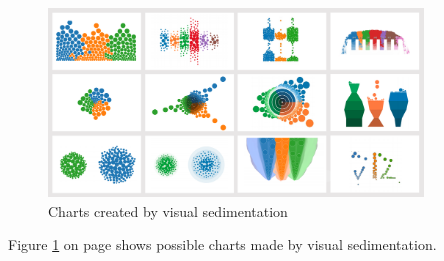 \begin{figure}[!htb]
\centering
\includegraphics[height=5cm]{images/methods/related/visual-sedimentation}
\caption[
    Charts created by visual sedimentation .
]{Charts created by visual sedimentation}
\label{fig:visual-sedimentation}
\end{figure}

Figure \ref{fig:visual-sedimentation} on page \pageref{fig:visual-sedimentation} shows possible charts made by visual sedimentation.